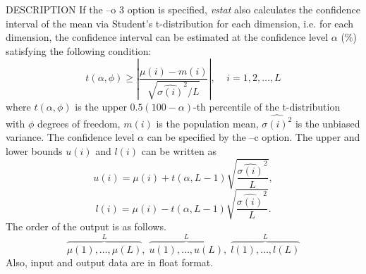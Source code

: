 \begin{qsection}{DESCRIPTION}
If the --o 3 option is specified, {\em vstat} also calculates the confidence
interval of the mean via Student's t-distribution for each dimension,
i.e. for each dimension, the confidence interval can be estimated
at the confidence level $\alpha$ (\%) satisfying the following condition:
 \begin{displaymath}
  t(\alpha, \phi) \geq
  \left| \frac{\mu(i) -m(i)}{\sqrt{\hat{\sigma(i)}^{2} / L} }\right|
  ,   \;\;\;\; i = 1,  2, \dots, L
 \end{displaymath}
where $t(\alpha, \phi)$ is the upper $0.5(100 - \alpha)$-th percentile
of the t-distribution with $\phi$ degrees of freedom,
$m(i)$ is the population mean, $\hat{\sigma(i)^{2}}$ is the unbiased variance.
The confidence level $\alpha$ can be specified by the --c option.
The upper and lower bounds $u(i)$ and $l(i)$ can be written as
 \begin{displaymath}
  u(i) = \mu(i) + t(\alpha, L - 1) \sqrt{\frac{\hat{\sigma(i)}^{2}}{L}},
 \end{displaymath}
 \begin{displaymath}
  l(i) = \mu(i) - t(\alpha, L - 1) \sqrt{\frac{\hat{\sigma(i)}^{2}}{L}}.
 \end{displaymath}
The order of the output is as follows.
 \begin{displaymath}
  \overbrace{\mu(1),\dots,\mu(L)}^L, \; \overbrace{u(1),\dots,u(L)}^L,
    \;\overbrace{l(1),\dots,l(L)}^L
 \end{displaymath}
Also, input and output data are in float format.
\end{qsection}

\begin{options}
\end{options}

